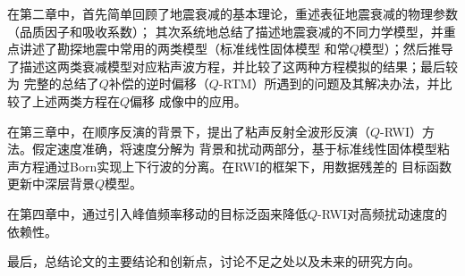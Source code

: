 在第二章中，首先简单回顾了地震衰减的基本理论，重述表征地震衰减的物理参数（品质因子和吸收系数）；
其次系统地总结了描述地震衰减的不同力学模型，并重点讲述了勘探地震中常用的两类模型（标准线性固体模型
和常$Q$模型）；然后推导了描述这两类衰减模型对应粘声波方程，并比较了这两种方程模拟的结果；最后较为
完整的总结了$Q$补偿的逆时偏移（$Q$-RTM）所遇到的问题及其解决办法，并比较了上述两类方程在$Q$偏移
成像中的应用。

在第三章中，在顺序反演的背景下，提出了粘声反射全波形反演（$Q$-RWI）方法。假定速度准确，将速度分解为
背景和扰动两部分，基于标准线性固体模型粘声方程通过Born实现上下行波的分离。在RWI的框架下，用数据残差的
目标函数更新中深层背景$Q$模型。

在第四章中，通过引入峰值频率移动的目标泛函来降低$Q$-RWI对高频扰动速度的依赖性。

最后，总结论文的主要结论和创新点，讨论不足之处以及未来的研究方向。

















